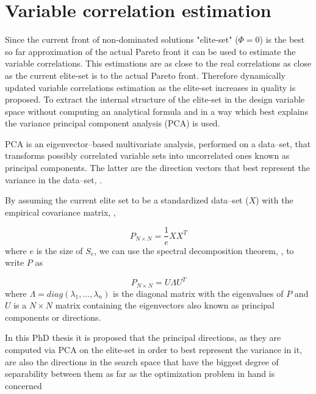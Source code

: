 \section{Variable correlation estimation}
Since the current front of non-dominated solutions "elite-set" ($\Phi=0$) is the best so far approximation of the actual Pareto front it can be used to estimate the variable correlations. This estimations are as close to the real correlations as close as the current elite-set is to the actual Pareto front. Therefore dynamically updated variable correlations estimation as the elite-set increases in quality is proposed. To extract the internal structure of the elite-set in the design variable space without computing an analytical formula and in a way which best explains the variance principal component analysis (PCA) is used. 
 
PCA is an eigenvector--based multivariate analysis, performed on a data--set, that transforms possibly correlated variable sets into uncorrelated ones known as principal components. The latter are the direction vectors that best represent the variance in the data--set, \cite{Haykin,Jolliffe_2002}.
 
By assuming the current elite set to be a standardized data--set ($X$) with the empirical covariance matrix, \cite{Fodor_2002, Jolliffe_2002},

\begin{equation} 
   P_{N\times N}= \frac{1}{e}XX^T
   \label{Cov_Mat} 
\end{equation}
where $e$ is the size of $S_e$, we can use the spectral decomposition theorem, \cite{Axler_1997, Fodor_2002}, to write $P$ as

\begin{equation} 
   P_{N\times N}= U\Lambda U^T
   \label{spectral}
\end{equation}
where $\Lambda\!=\!diag(\lambda_1 , . . . , \lambda_n )$ is the diagonal matrix with the eigenvalues of $P$ and $U$ is a $N\!\times\!N$ matrix containing the eigenvectors also known as principal components or directions. 

In this PhD thesis it is proposed that the principal directions, as they are computed via PCA on the elite-set in order to best represent the variance in it, are also the directions in the search space that have the biggest degree of separability between them as far as the optimization problem in hand is concerned 

